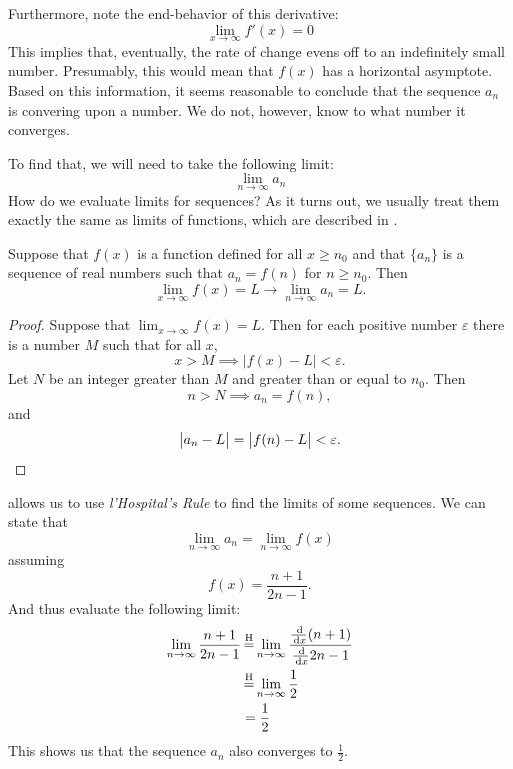 \begin{ex}
    Furthermore, note the end-behavior of this derivative:
    \[ \lim_{x \to \infty} f'(x) = 0 \]
    This implies that, eventually, the rate of change evens off to an indefinitely small number.
    Presumably, this would mean that \(f(x)\) has a horizontal asymptote.
    Based on this information, it seems reasonable to conclude that the sequence \(a_n\) is convering upon a number.
    We do not, however, know to what number it converges.

    To find that, we will need to take the following limit:
    \[ \lim_{n\to\infty} a_n \]
    How do we evaluate limits for sequences? As it turns out, we usually treat
    them exactly the same as limits of functions, which are described in .
    \begin{theorem}\label{th:inftyanlimit}
      Suppose that \(f(x)\) is a function defined for all \( x \geq n_0\) and
      that \( \{a_n\} \) is a sequence of real numbers such that \(a_n = f(n)\)
      for \(n \geq n_0\). Then
      \[ \lim_{x \to \infty} f(x) = L \to \lim_{n \to \infty} a_n = L\text{.} \]
      \begin{proof}
        Suppose that \( \lim_{x \to \infty} f(x) = L \). Then for each positive
        number \( \varepsilon \) there is a number \( M \) such that for all
        \(x\),
        \[ x > M \implies \big| f(x) - L \big| < \varepsilon. \]
        Let \(N\) be an integer greater than \(M\) and greater than or equal to
        \(n_0\). Then
        \[ n > N \implies a_n = f(n),\]
        and
        \[\big|a_n -L \big| = \big|f(n) - L\big| < \varepsilon. \qedhere\]
        \cite[p. 537]{thomas}%
      \end{proof}
    \end{theorem}
     allows us to use \emph{l'Hospital's Rule} to find the limits of some
    sequences. We can state that
    \[\lim_{n\to\infty} a_n =\lim_{n\to\infty}f(x)\]
    assuming
    \[f(x)=\frac{n+1}{2n-1}\text{.}\]
    And thus evaluate the following limit:
    \begin{align*}
      \lim_{n\to\infty} \frac{n+1}{2n-1}
      &\=H \lim_{n\to\infty} \dfrac{\frac{\ud}{\ud x}(n+1)}{\frac{\ud}{\ud x}2n-1} \\
      &\=H \lim_{n\to\infty} \frac{1}{2} \\
      &= \frac{1}{2}
    \end{align*}
    This shows us that the sequence $a_n$ also converges to \(\frac{1}{2}\).
    \begin{figure}[H]

\end{figure}
\end{ex}
